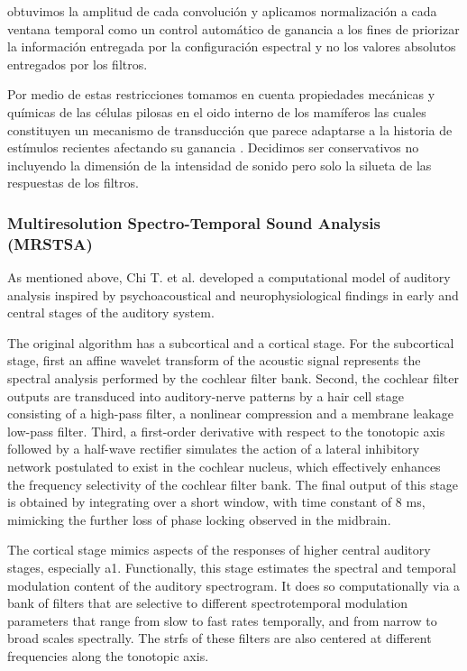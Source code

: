 {obtuvimos la amplitud de cada convolución y aplicamos normalización a cada ventana temporal
como un control automático de ganancia a los fines de priorizar la información entregada por la
configuración espectral y no los valores absolutos entregados por los filtros.

Por medio de estas restricciones tomamos en cuenta propiedades mecánicas y químicas de las células pilosas en el oido interno de los mamíferos
las cuales constituyen un mecanismo de transducción que parece adaptarse a la historia de estímulos recientes afectando su ganancia
\cite{eatock_2000,holt_2000,le_goff_2005}. 
Decidimos ser conservativos no incluyendo la dimensión de la intensidad de sonido pero solo la silueta de las respuestas de los filtros.
}{
\subsubsection{Multiresolution Spectro-Temporal Sound Analysis (MRSTSA)}

As mentioned above, Chi T. et al. \cite{chi_2005} developed a computational model of auditory analysis inspired by psychoacoustical and
neurophysiological findings in early and central stages of the auditory system.

The original algorithm has a subcortical and a cortical stage.
For the subcortical stage, first an affine wavelet transform of the acoustic signal
represents the spectral analysis performed by the cochlear filter bank.
Second, the cochlear filter outputs are transduced into auditory-nerve
patterns by a hair cell stage consisting of a high-pass filter,
a nonlinear compression and a membrane leakage low-pass filter.
Third, a first-order derivative with respect to the tonotopic axis
followed by a half-wave rectifier
simulates the action of a lateral inhibitory
network postulated to exist in the cochlear nucleus,
which effectively enhances the frequency
selectivity of the cochlear filter bank.
The final output of this stage is obtained by integrating
over a short window, with time constant of 8 ms, mimicking
the further loss of phase locking observed
in the midbrain.

The cortical stage mimics aspects of the responses of higher
central auditory stages, especially \gls{a1}.
Functionally, this stage estimates the
spectral and temporal modulation content of the auditory
spectrogram. It does so computationally via a bank of filters
that are selective to different spectrotemporal modulation parameters
that range from slow to fast rates temporally, and
from narrow to broad scales spectrally. The \glspl{strf}
of these filters are also centered at
different frequencies along the tonotopic axis.

}
